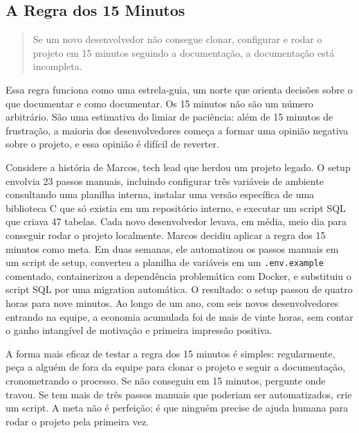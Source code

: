 \subsection{A Regra dos 15 Minutos}

\begin{quote}
Se um novo desenvolvedor não consegue clonar, configurar e rodar o projeto
em 15 minutos seguindo a documentação, a documentação está incompleta.
\end{quote}

Essa regra funciona como uma estrela-guia, um norte que orienta
decisões sobre o que documentar e como documentar. Os 15 minutos não
são um número arbitrário. São uma estimativa do limiar de paciência:
além de 15 minutos de frustração, a maioria dos desenvolvedores começa
a formar uma opinião negativa sobre o projeto, e essa opinião é
difícil de reverter.

Considere a história de Marcos, tech lead que herdou um projeto
legado. O setup envolvia 23 passos manuais, incluindo configurar três
variáveis de ambiente consultando uma planilha interna, instalar uma
versão específica de uma biblioteca C que só existia em um repositório
interno, e executar um script SQL que criava 47 tabelas. Cada novo
desenvolvedor levava, em média, meio dia para conseguir rodar o projeto
localmente. Marcos decidiu aplicar a regra dos 15 minutos como meta. Em
duas semanas, ele automatizou os passos manuais em um script de setup,
converteu a planilha de variáveis em um \texttt{.env.example} comentado,
containerizou a dependência problemática com Docker, e substituiu o
script SQL por uma migration automática. O resultado: o setup passou de
quatro horas para nove minutos. Ao longo de um ano, com seis novos
desenvolvedores entrando na equipe, a economia acumulada foi de mais de
vinte horas, sem contar o ganho intangível de motivação e primeira
impressão positiva.

A forma mais eficaz de testar a regra dos 15 minutos é simples:
regularmente, peça a alguém de fora da equipe para clonar o projeto e
seguir a documentação, cronometrando o processo. Se não conseguiu em
15 minutos, pergunte onde travou. Se tem mais de três passos manuais
que poderiam ser automatizados, crie um script. A meta não é perfeição;
é que ninguém precise de ajuda humana para rodar o projeto pela primeira
vez.


